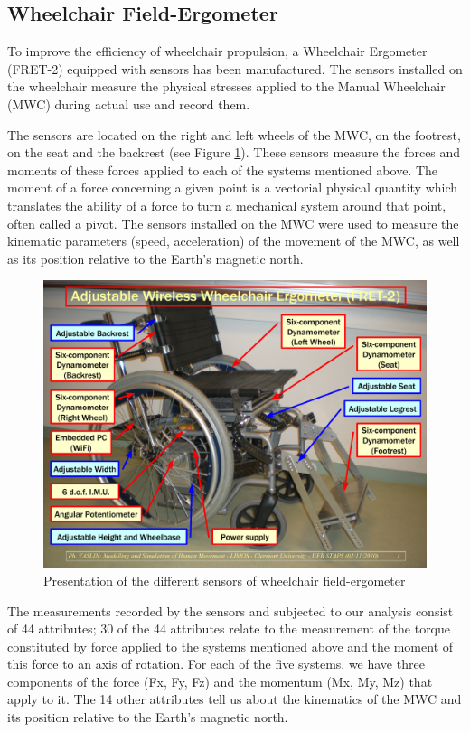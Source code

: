 \subsection{Wheelchair Field-Ergometer}
To improve the efficiency of wheelchair propulsion, a Wheelchair Ergometer (FRET-2) equipped with sensors has been manufactured. The sensors installed on the wheelchair measure the physical stresses applied to the Manual Wheelchair (MWC) during actual use and record them.


The sensors are located on the right and left wheels of the MWC, on the footrest, on the seat and the backrest (see Figure \ref{fret_legend}). These sensors measure the forces and moments of these forces applied to each of the systems mentioned above.  The moment of a force concerning a given point is a vectorial physical quantity which translates the ability of a force to turn a mechanical system around that point, often called a pivot. The sensors installed on the MWC were used to measure the kinematic parameters (speed, acceleration) of the movement of the MWC, as well as its position relative to the Earth's magnetic north.


\begin{figure}[h]
\center
\includegraphics[scale = 0.4]{images/FRET-2_Legend_GB}
\caption{Presentation of the different sensors of wheelchair field-ergometer}
\label{fret_legend}
\end{figure}


The measurements recorded by the sensors and subjected to our analysis consist of 44 attributes; 30 of the 44 attributes relate to the measurement of the torque constituted by force applied to the systems mentioned above and the moment of this force to an axis of rotation. For each of the five systems, we have three components of the force (Fx, Fy, Fz) and the momentum (Mx, My, Mz) that apply to it. The 14 other attributes tell us about the kinematics of the MWC and its position relative to the Earth's magnetic north.

